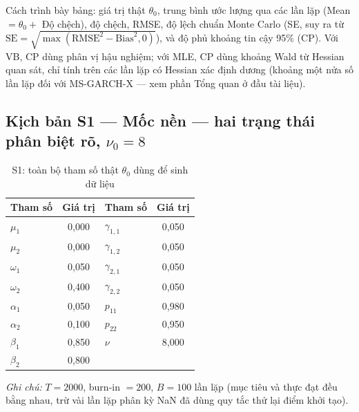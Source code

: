 \documentclass[11pt,a4paper]{article}
\begin{document}
Cách trình bày bảng: giá trị thật $\theta_0$, trung bình ước lượng qua các lần
lặp (Mean $=\theta_0+$ Độ chệch), độ chệch, RMSE, độ lệch chuẩn Monte Carlo (SE,
suy ra từ $\mathrm{SE}=\sqrt{\max(\mathrm{RMSE}^2-\mathrm{Bias}^2,0)}$), và độ
phủ khoảng tin cậy 95\% (CP). Với VB, CP dùng phân vị hậu nghiệm; với MLE, CP
dùng khoảng Wald từ Hessian quan sát, chỉ tính trên các lần lặp có Hessian xác
định dương (khoảng một nửa số lần lặp đối với MS-GARCH-X --- xem phần Tổng
quan ở đầu tài liệu).

\subsection*{Kịch bản S1 --- Mốc nền --- hai trạng thái phân biệt rõ, $\nu_0=8$}
\begin{table}[H]\centering\normalsize
\caption{S1: toàn bộ tham số thật $\theta_0$ dùng để sinh dữ liệu}
\begin{tabularx}{\textwidth}{l C  l C}
\toprule
\textbf{Tham số} & \textbf{Giá trị} & \textbf{Tham số} & \textbf{Giá trị} \\
\midrule
$\mu_1$ & 0,000 & $\gamma_{1,1}$ & 0,050 \\
$\mu_2$ & 0,000 & $\gamma_{1,2}$ & 0,050 \\
$\omega_1$ & 0,050 & $\gamma_{2,1}$ & 0,050 \\
$\omega_2$ & 0,400 & $\gamma_{2,2}$ & 0,050 \\
$\alpha_1$ & 0,050 & $p_{11}$ & 0,980 \\
$\alpha_2$ & 0,100 & $p_{22}$ & 0,950 \\
$\beta_1$ & 0,850 & $\nu$ & 8,000 \\
$\beta_2$ & 0,800 &  &  \\
\bottomrule
\end{tabularx}
\vspace{0.2em}\raggedright\scriptsize \emph{Ghi chú:} $T=2000$, burn-in $=200$, $B=100$ lần lặp (mục tiêu và thực đạt đều bằng nhau, trừ vài lần lặp phân kỳ NaN đã dùng quy tắc thử lại điểm khởi tạo).
\end{table}
\end{document}
